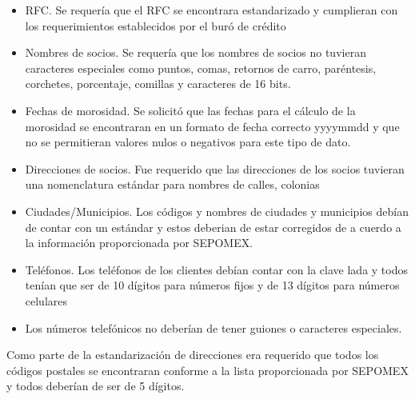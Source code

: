 \begin{itemize}

\item RFC. Se requería que el RFC se encontrara estandarizado y cumplieran con los requerimientos establecidos por el buró de crédito

\item Nombres de socios. Se requería que los nombres de socios no tuvieran caracteres especiales como puntos, comas, retornos de carro, paréntesis, corchetes, porcentaje, comillas y caracteres de 16 bits.

\item Fechas de morosidad. Se solicitó que las fechas para el cálculo de la morosidad se encontraran en un formato de fecha correcto yyyymmdd y que no se permitieran valores nulos o negativos para este tipo de dato.

\item Direcciones de socios. Fue requerido que las direcciones de los socios tuvieran una nomenclatura estándar para nombres de calles, colonias

\item Ciudades/Municipios. Los códigos y nombres de ciudades y municipios debían de contar con un estándar y estos deberian de estar corregidos de a cuerdo a la información proporcionada por SEPOMEX.

\item Teléfonos. Los teléfonos de los clientes debían contar con la clave lada y todos tenían que ser de 10 dígitos para números fijos y de 13 dígitos para números celulares

\item Los números telefónicos no deberían de tener guiones o caracteres especiales.
\end{itemize}

Como parte de la estandarización de direcciones era requerido que todos los códigos postales se encontraran conforme a la lista proporcionada por SEPOMEX y todos deberían de ser de 5 dígitos.

\cleardoublepage

